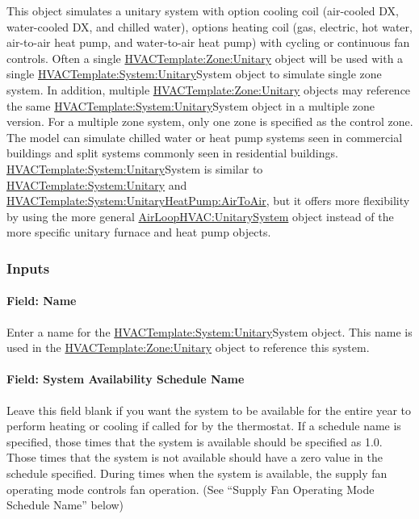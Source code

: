 This object simulates a unitary system with option cooling coil (air-cooled DX, water-cooled DX, and chilled water), options heating coil (gas, electric, hot water, air-to-air heat pump, and water-to-air heat pump) with cycling or continuous fan controls. Often a single \hyperref[hvactemplatezoneunitary]{HVACTemplate:Zone:Unitary} object will be used with a single \hyperref[hvactemplatesystemunitary]{HVACTemplate:System:Unitary}System object to simulate single zone system. In addition, multiple \hyperref[hvactemplatezoneunitary]{HVACTemplate:Zone:Unitary} objects may reference the same \hyperref[hvactemplatesystemunitary]{HVACTemplate:System:Unitary}System object in a multiple zone version. For a multiple zone system, only one zone is specified as the control zone. The model can simulate chilled water or heat pump systems seen in commercial buildings and split systems commonly seen in residential buildings. \hyperref[hvactemplatesystemunitary]{HVACTemplate:System:Unitary}System is similar to \hyperref[hvactemplatesystemunitary]{HVACTemplate:System:Unitary} and \hyperref[hvactemplatesystemunitaryheatpumpairtoair]{HVACTemplate:System:UnitaryHeatPump:AirToAir}, but it offers more flexibility by using the more general \hyperref[airloophvacunitarysystem]{AirLoopHVAC:UnitarySystem} object instead of the more specific unitary furnace and heat pump objects.

\subsubsection{Inputs}\label{inputs-2016-06-16-1621}

\paragraph{Field: Name}\label{field-name-4-013}

Enter a name for the \hyperref[hvactemplatesystemunitary]{HVACTemplate:System:Unitary}System object. This name is used in the \hyperref[hvactemplatezoneunitary]{HVACTemplate:Zone:Unitary} object to reference this system.

\paragraph{Field: System Availability Schedule Name}\label{field-system-availability-schedule-name-9}

Leave this field blank if you want the system to be available for the entire year to perform heating or cooling if called for by the thermostat. If a schedule name is specified, those times that the system is available should be specified as 1.0. Those times that the system is not available should have a zero value in the schedule specified. During times when the system is available, the supply fan operating mode controls fan operation. (See ``Supply Fan Operating Mode Schedule Name'' below)


